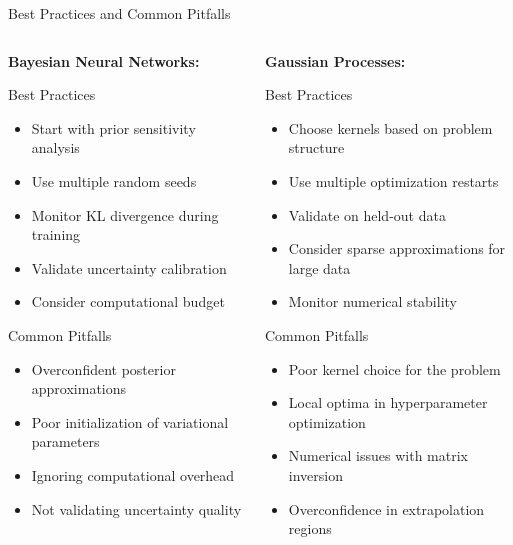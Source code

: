 \documentclass[aspectratio=169,11pt]{beamer}
\begin{document}
\begin{frame}{Best Practices and Common Pitfalls}
\begin{columns}
\begin{column}{0.5\textwidth}
\textbf{Bayesian Neural Networks:}

\begin{block}{Best Practices}
\begin{itemize}
\item Start with prior sensitivity analysis
\item Use multiple random seeds
\item Monitor KL divergence during training
\item Validate uncertainty calibration
\item Consider computational budget
\end{itemize}
\end{block}

\begin{alertblock}{Common Pitfalls}
\begin{itemize}
\item Overconfident posterior approximations
\item Poor initialization of variational parameters
\item Ignoring computational overhead
\item Not validating uncertainty quality
\end{itemize}
\end{alertblock}
\end{column}
\begin{column}{0.5\textwidth}
\textbf{Gaussian Processes:}

\begin{block}{Best Practices}
\begin{itemize}
\item Choose kernels based on problem structure
\item Use multiple optimization restarts
\item Validate on held-out data
\item Consider sparse approximations for large data
\item Monitor numerical stability
\end{itemize}
\end{block}

\begin{alertblock}{Common Pitfalls}
\begin{itemize}
\item Poor kernel choice for the problem
\item Local optima in hyperparameter optimization
\item Numerical issues with matrix inversion
\item Overconfidence in extrapolation regions
\end{itemize}
\end{alertblock}
\end{column}
\end{columns}


\end{frame}
\end{document}

